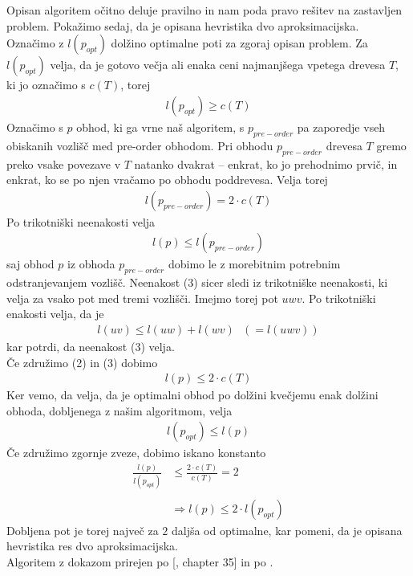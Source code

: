 \documentclass[a4paper,11pt]{article}
\begin{document}
\\
\\
Opisan algoritem očitno deluje pravilno in nam poda pravo rešitev na zastavljen problem.
Pokažimo sedaj, da je opisana hevristika dvo aproksimacijska.
\\
Označimo z $l(p_{opt})$ dolžino optimalne poti za zgoraj opisan problem. Za $l(p_{opt})$ velja, da je gotovo večja ali enaka ceni najmanjšega vpetega drevesa $T$, ki jo označimo s $c(T)$, torej
\begin{align}
l(p_{opt}) \geq c(T)
\end{align}
Označimo s $p$ obhod, ki ga vrne naš algoritem, s $p_{pre-order}$ pa zaporedje vseh obiskanih vozlišč med pre-order obhodom.
Pri obhodu $p_{pre-order}$ drevesa $T$ gremo preko vsake povezave v $T$ natanko dvakrat -- enkrat, ko jo prehodnimo prvič, in enkrat, ko se po njen vračamo po obhodu poddrevesa. Velja torej
\begin{align}
l(p_{pre-order}) = 2 \cdot c(T)
\end{align}
Po trikotniški neenakosti velja
\begin{align}
    l(p) \leq l(p_{pre-order})
\end{align}
saj obhod $p$ iz obhoda $p_{pre-order}$ dobimo le z morebitnim potrebnim odstranjevanjem vozlišč. 
Neenakost (3) sicer sledi iz trikotniške neenakosti, ki velja za vsako pot med tremi vozlišči. Imejmo torej pot $uwv$. Po trikotniški enakosti velja, da je 
\begin{align}
    l(uv) \leq l(uw) + l(wv) \ \ \ ( = l(uwv))
\end{align}
kar potrdi, da neenakost (3) velja.
\\
Če združimo (2) in (3) dobimo
\begin{align*}
    l(p) \leq 2 \cdot c(T)
\end{align*}
Ker vemo, da velja, da je optimalni obhod po dolžini kvečjemu enak dolžini obhoda, dobljenega z našim algoritmom, velja
\begin{align}
    l(p_{opt}) \leq l(p)
\end{align}
Če združimo zgornje zveze, dobimo iskano konstanto
\begin{align*}
    \frac{l(p)}{l(p_{opt})} &\leq \frac{2 \cdot c(T)}{c(T)} = 2
    \\
    \\
    &\Rightarrow l(p) \leq 2 \cdot l(p_{opt})
\end{align*}
Dobljena pot je torej največ za $2$ daljša od optimalne, kar pomeni, da je opisana hevristika res dvo aproksimacijska.
\\
Algoritem z dokazom prirejen po [\cite{vir}, chapter 35] in po \cite{nal2_1}.
\end{document}
